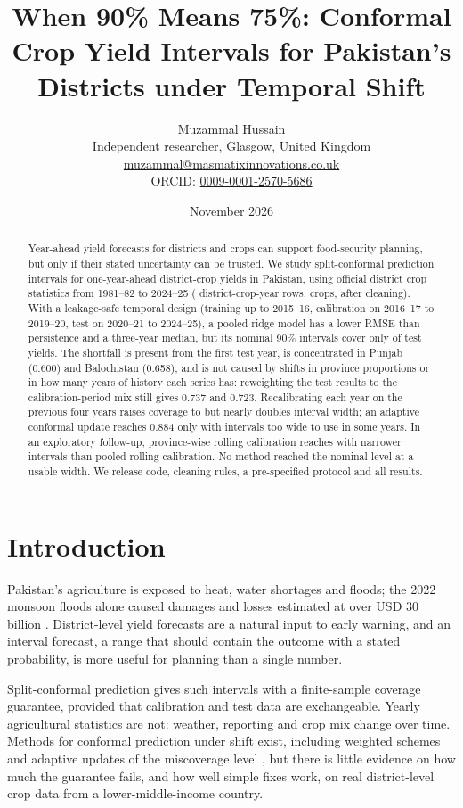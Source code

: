 \documentclass[11pt]{article}
\title{When 90\% Means 75\%: Conformal Crop Yield Intervals for Pakistan's Districts under Temporal Shift}
\author{Muzammal Hussain\\
\small Independent researcher, Glasgow, United Kingdom\\
\small \href{mailto:muzammal@masmatixinnovations.co.uk}{muzammal@masmatixinnovations.co.uk}\\
\small ORCID: \href{https://orcid.org/0009-0001-2570-5686}{0009-0001-2570-5686}}
\date{\small November 2026}
\begin{document}
\maketitle

\begin{abstract}
Year-ahead yield forecasts for districts and crops can support food-security planning, but only if their stated uncertainty can be trusted. We study split-conformal prediction intervals for one-year-ahead district-crop yields in Pakistan, using official district crop statistics from 1981--82 to 2024--25 (\RowsOut{} district-crop-year rows, \Crops{} crops, after cleaning). With a leakage-safe temporal design (training up to 2015--16, calibration on 2016--17 to 2019--20, test on 2020--21 to 2024--25), a pooled ridge model has a lower RMSE than persistence and a three-year median, but its nominal 90\% intervals cover only \FixedCov{} of \TestN{} test yields. The shortfall is present from the first test year, is concentrated in Punjab (0.600) and Balochistan (0.658), and is not caused by shifts in province proportions or in how many years of history each series has: reweighting the test results to the calibration-period mix still gives 0.737 and 0.723. Recalibrating each year on the previous four years raises coverage to \RollCov{} but nearly doubles interval width; an adaptive conformal update reaches 0.884 only with intervals too wide to use in some years. In an exploratory follow-up, province-wise rolling calibration reaches \MonRollCov{} with narrower intervals than pooled rolling calibration. No method reached the nominal level at a usable width. We release code, cleaning rules, a pre-specified protocol and all results.
\end{abstract}

\section{Introduction}
Pakistan's agriculture is exposed to heat, water shortages and floods; the 2022 monsoon floods alone caused damages and losses estimated at over USD 30 billion \citep{undp2022}. District-level yield forecasts are a natural input to early warning, and an interval forecast, a range that should contain the outcome with a stated probability, is more useful for planning than a single number.

Split-conformal prediction \citep{vovk2005,lei2018} gives such intervals with a finite-sample coverage guarantee, provided that calibration and test data are exchangeable. Yearly agricultural statistics are not: weather, reporting and crop mix change over time. Methods for conformal prediction under shift exist, including weighted schemes \citep{barber2023} and adaptive updates of the miscoverage level \citep{gibbs2021}, but there is little evidence on how much the guarantee fails, and how well simple fixes work, on real district-level crop data from a lower-middle-income country.
\end{document}
